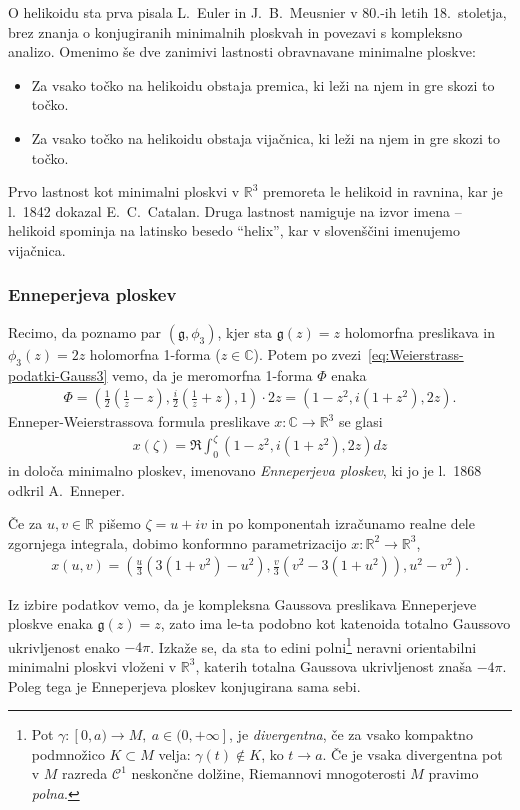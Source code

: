 \documentclass[12pt,a4paper,twoside]{article}
\theoremstyle{definition} %
\theoremstyle{plain} %
\numberwithin{equation}{section}  %
\begin{document}
O helikoidu sta prva pisala L.~Euler in J.~B.~Meusnier v 80.-ih letih 18.~stoletja, brez znanja o konjugiranih minimalnih ploskvah in povezavi s kompleksno analizo. Omenimo še dve zanimivi lastnosti obravnavane minimalne ploskve:
\begin{itemize}
\item Za vsako točko na helikoidu obstaja premica, ki leži na njem in gre skozi to točko.
\item Za vsako točko na helikoidu obstaja vijačnica, ki leži na njem in gre skozi to točko.
\end{itemize}
Prvo lastnost kot minimalni ploskvi v $\mathbb{R}^3$ premoreta le helikoid in ravnina, kar je l.~1842 dokazal E.~C.~Catalan. Druga lastnost namiguje na izvor imena -- helikoid spominja na latinsko besedo ``helix'', kar v slovenščini imenujemo vijačnica.

\subsubsection{Enneperjeva ploskev}
%
Recimo, da poznamo par $(\mathfrak{g}, \phi_3)$, kjer sta $\mathfrak{g}(z) = z$ holomorfna preslikava in $\phi_3(z) = 2z$ holomorfna 1-forma ($z \in \mathbb{C}$).
Potem po zvezi~\ref{eq:Weierstrass-podatki-Gauss3} vemo, da je meromorfna 1-forma $\Phi$ enaka
\begin{gather*}
\Phi = \left( \frac{1}{2} \left( \frac{1}{z} - z \right), \frac{i}{2} \left( \frac{1}{z} + z \right), 1 \right) \cdot 2z = \left( 1-z^2, i(1+z^2), 2z \right).
\end{gather*}
Enneper-Weierstrassova formula preslikave $x \colon \mathbb{C} \to \mathbb{R}^3$ se glasi
\begin{gather}
x(\zeta) = \Re \int_{0}^{\zeta} \left( 1-z^2, i(1+z^2), 2z \right) dz
\end{gather}
in določa minimalno ploskev, imenovano \emph{Enneperjeva ploskev}, ki jo je l.~1868 odkril A.~Enneper.

Če za $ u,v \in \mathbb{R}$ pišemo $\zeta = u + iv$ in po komponentah izračunamo realne dele zgornjega integrala, dobimo konformno parametrizacijo $x \colon \mathbb{R}^2 \to \mathbb{R}^3$,
\begin{gather}
x(u,v) = \left( \frac{u}{3} \left(3(1+v^2) - u^2 \right), \frac{v}{3} \left( v^2 - 3(1+u^2) \right), u^2 - v^2 \right).
\end{gather}

Iz izbire podatkov vemo, da je kompleksna Gaussova preslikava Enneperjeve ploskve enaka $\mathfrak{g}(z) = z$, zato ima le-ta podobno kot katenoida totalno Gaussovo ukrivljenost enako $-4 \pi$. Izkaže se, da sta to edini polni\footnote{Pot $\gamma \colon [0,a) \to M, \ a \in (0,+\infty]$, je \emph{divergentna}, če za vsako kompaktno podmnožico $K \subset M$ velja: $\gamma(t) \notin K$, ko $t \to a$. Če je vsaka divergentna pot v $M$ razreda $\mathcal{C}^{1}$ neskončne dolžine, Riemannovi mnogoterosti $M$ pravimo \emph{polna}.} neravni orientabilni minimalni ploskvi vloženi v $\mathbb{R}^3$, katerih totalna Gaussova ukrivljenost znaša $-4 \pi$. Poleg tega je Enneperjeva ploskev konjugirana sama sebi.
\end{document}
